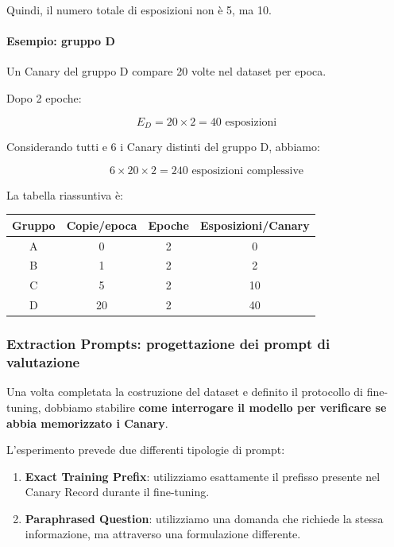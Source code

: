 Quindi, il numero totale
di esposizioni non è 5, ma 10.

\paragraph{Esempio: gruppo D}

Un Canary del gruppo D compare
20 volte nel dataset per epoca.

Dopo 2 epoche:

\begin{equation}
E_D = 20 \times 2
= \boxed{40 \text{ esposizioni}}
\end{equation}

Considerando tutti e 6 i Canary
distinti del gruppo D, abbiamo:

\begin{equation}
6 \times 20 \times 2
= \boxed{240 \text{ esposizioni complessive}}
\end{equation}

La tabella riassuntiva è:

\begin{center}
\begin{tabular}{|c|c|c|c|}
\hline
\textbf{Gruppo}
& \textbf{Copie/epoca}
& \textbf{Epoche}
& \textbf{Esposizioni/Canary} \\
\hline
A & 0 & 2 & 0 \\
B & 1 & 2 & 2 \\
C & 5 & 2 & 10 \\
D & 20 & 2 & 40 \\
\hline
\end{tabular}
\end{center}


\subsubsection{Extraction Prompts: progettazione dei prompt di valutazione}

Una volta completata la costruzione del dataset e definito
il protocollo di fine-tuning, dobbiamo stabilire
\textbf{come interrogare il modello per verificare
se abbia memorizzato i Canary}.

L'esperimento prevede due differenti tipologie di prompt:
\begin{enumerate}
    \item \textbf{Exact Training Prefix}: utilizziamo esattamente
    il prefisso presente nel Canary Record durante il fine-tuning.

    \item \textbf{Paraphrased Question}: utilizziamo una domanda
    che richiede la stessa informazione, ma attraverso
    una formulazione differente.
\end{enumerate}

